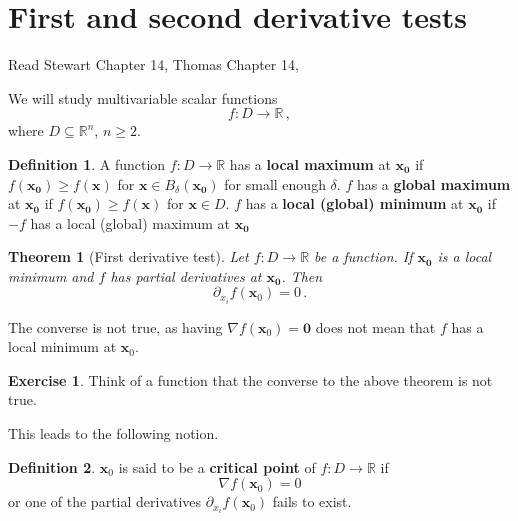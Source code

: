 \documentclass[
]{book}
\newtheorem{theorem}{Theorem}[chapter]
\theoremstyle{definition}
\newtheorem{definition}{Definition}[chapter]
\theoremstyle{definition}
\theoremstyle{definition}
\newtheorem{exercise}{Exercise}[chapter]
\theoremstyle{definition}
\theoremstyle{remark}
\begin{document}
\hypertarget{first-and-second-derivative-tests}{%
\section{First and second derivative tests}\label{first-and-second-derivative-tests}}

Read Stewart Chapter 14, Thomas Chapter 14,

We will study multivariable scalar functions
\[ f: D \to \mathbb{R}\,,\]
where \(D\subseteq \mathbb{R}^n\), \(n\geq 2\).

\begin{definition}
A function \(f:D \to \mathbb{R}\) has a \textbf{local maximum} at \(\mathbf{x_0}\) if
\(f(\mathbf{x_0}) \geq f(\mathbf{x})\) for \(\mathbf{x} \in B_\delta(\mathbf{x_0})\) for small enough \(\delta\).
\(f\) has a \textbf{global maximum} at \(\mathbf{x_0}\) if
\(f(\mathbf{x_0}) \geq f(\mathbf{x})\) for \(\mathbf{x} \in D\).
\(f\) has a \textbf{local (global) minimum} at \(\mathbf{x_0}\) if
\(-f\) has a local (global) maximum at \(\mathbf{x_0}\)
\end{definition}

\begin{theorem}[First derivative test]
Let \(f:D \to \mathbb{R}\) be a function.
If \(\mathbf{x_0}\) is a local minimum and \(f\) has partial derivatives at \(\mathbf{x_0}\).
Then
\begin{equation*}
    \partial_{x_i} f(\mathbf{x}_0) = 0 \,.
\end{equation*}
\end{theorem}

The converse is not true, as having \(\nabla f(\mathbf{x}_0) = \mathbf{0}\) does not mean
that \(f\) has a local minimum at \(\mathbf{x}_0\).

\begin{exercise}
Think of a function that the converse to the above theorem is not true.
\end{exercise}

This leads to the following notion.

\begin{definition}
\(\mathbf{x}_0\) is said to be a \textbf{critical point} of \(f:D\to \mathbb{R}\) if
\begin{equation*}
    \nabla f(\mathbf{x}_0) = 0
\end{equation*}
or one of the partial derivatives \(\partial_{x_i} f(\mathbf{x}_0)\) fails to exist.
\end{definition}
\end{document}

